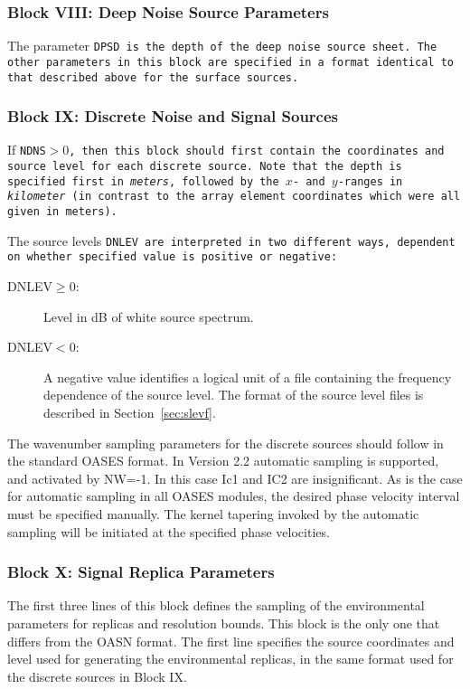 \subsubsection{Block VIII: Deep Noise Source Parameters}

The parameter \tt DPSD \rm is the depth of the deep noise source
sheet. The other parameters in this block are specified in a format
identical to that described above for the surface sources.

\subsubsection{Block IX: Discrete Noise and Signal Sources}

If \tt NDNS\rm$>0$, then this block should first contain the
coordinates and source level for each discrete source. Note that the
depth is specified first in {\em meters}, followed by the $x$- and
$y$-ranges in {\em kilometer} (in contrast to the array element
coordinates which were all given in meters).

The source levels \tt DNLEV \rm are interpreted in two different ways,
dependent on whether specified value is positive or negative:

\begin{description}
\item[DNLEV$\ge0$:] Level in dB of white source spectrum.
\item[DNLEV$<0$:] A negative value identifies a logical unit of a file
containing the frequency dependence of the source level. The format of
the source level files is described in Section~\ref{sec:slevf}.
\end{description}

The wavenumber sampling parameters for the discrete sources should
follow in the standard OASES format. In Version 2.2 automatic sampling
is supported, and activated by NW=-1. In this case Ic1 and IC2 are
insignificant. As is the case for automatic sampling in all OASES
modules, the desired phase velocity interval must be specified
manually. The kernel tapering invoked by the automatic sampling will
be initiated at the specified phase velocities.

   
\subsubsection{Block X: Signal Replica Parameters}

The first three lines of this block defines the sampling of the
environmental parameters for replicas and resolution bounds. This
block is the only one that differs from the OASN format. The first
line specifies the source coordinates and level used for generating
the environmental replicas, in the same format used for the discrete
sources in Block IX.

